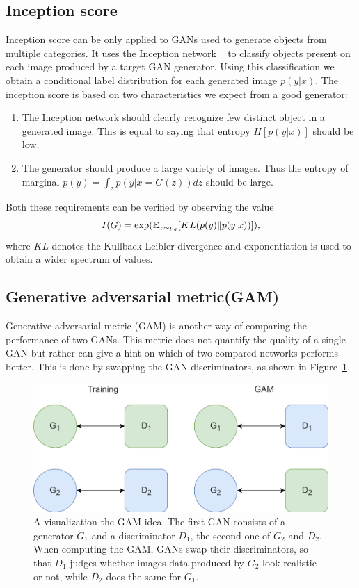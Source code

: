 \subsection{Inception score}
Inception score can be only applied to GANs used to generate objects from multiple categories. It uses the Inception network ~\cite{inception} to classify objects present on each image produced by a target GAN generator. Using this classification we obtain a conditional label distribution for each generated image $p(y | x)$. The inception score is based on two characteristics we expect from a good generator:
\begin{enumerate}
	\item The Inception network should clearly recognize few distinct object in a generated image. This is equal to saying that entropy $H[p(y|x)]$ should be low.
	\item The generator should produce a large variety of images. Thus the entropy of marginal $p(y) = \int_z p(y|x=G(z))dz$ should be large. 
\end{enumerate}
Both these requirements can be verified by observing the value 
\begin{equation}
I(G) = \exp(\operatorname{\mathbb{E}}_{x \sim p_g}[KL(p(y) \lVert p(y|x))]),
\end{equation}
where $KL$ denotes the Kullback-Leibler divergence and exponentiation is used to obtain a wider spectrum of values. 

\subsection{Generative adversarial metric(GAM)} \label{sec:gam}
Generative adversarial metric (GAM) is another way of comparing the performance of two GANs. This metric does not quantify the quality of a single GAN but rather can give a hint on which of two compared networks performs better. This is done by swapping the GAN discriminators, as shown in Figure~\ref{fig:gam}. 
\begin{figure}[h]
	\includegraphics[width=\textwidth]{figures/gam}
	\caption{A visualization the GAM idea. The first GAN consists of a generator $G_1$ and a discriminator $D_1$, the second one of $G_2$ and $D_2$. When computing the GAM, GANs swap their discriminators, so that $D_1$ judges whether images data produced by $G_2$ look realistic or not, while $D_2$ does the same for $G_1$.}
	\label{fig:gam}
\end{figure}
 
